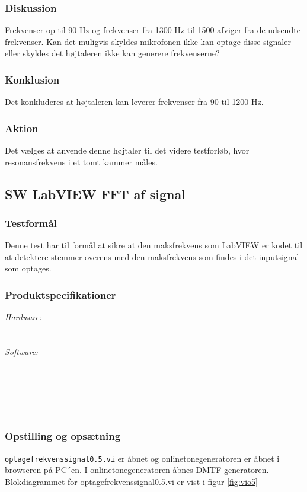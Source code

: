		\subsubsection{Diskussion} 
		Frekvenser op til 90 Hz og frekvenser fra 1300 Hz til 1500 afviger fra de udsendte frekvenser. Kan det muligvis skyldes mikrofonen ikke kan optage disse signaler eller skyldes det højtaleren ikke kan generere frekvenserne? 
		\subsubsection{Konklusion}
	Det konkluderes at højtaleren kan leverer frekvenser fra 90 til 1200 Hz. 
	    \subsubsection{Aktion}
	    Det vælges at anvende denne højtaler til det videre testforløb, hvor resonansfrekvens i et tomt kammer måles. 
	    
\subsection{SW LabVIEW FFT af signal}	
\subsubsection{Testformål}
		Denne test har til formål at sikre at den maksfrekvens som LabVIEW er kodet til at detektere stemmer overens med den maksfrekvens som findes i det inputsignal som optages.  
		\subsubsection{Produktspecifikationer}
	
		\textit{Hardware:}\\
		\PC\\
		\daq\\
	
		\textit{Software:}\\
		\labview\\
		\visa\\
		\vi\\
		\daqsoft\\
		\onlineg\\ 
	
		\subsubsection{Opstilling og opsætning}
		\texttt{optagefrekvenssignal0.5.vi} er åbnet og onlinetonegeneratoren er åbnet i browseren på PC´en. I onlinetonegeneratoren åbnes DMTF generatoren. Blokdiagrammet for {optagefrekvenssignal0.5.vi} er vist i figur \ref{fig:vio5}
		
